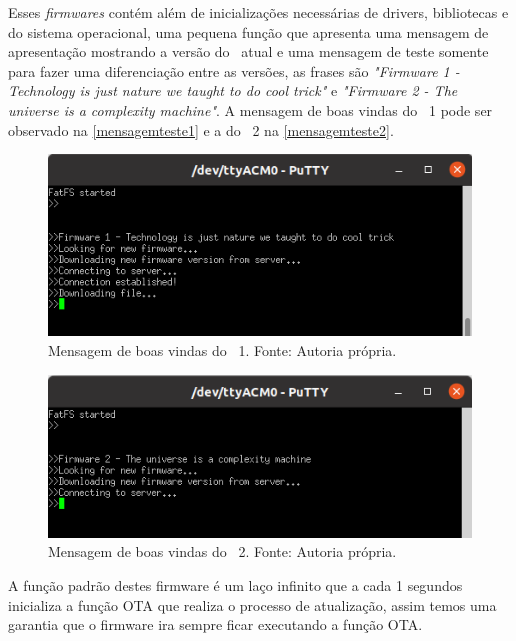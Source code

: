 Esses \textit{firmwares} contém além de inicializações necessárias de drivers, bibliotecas e do sistema operacional, uma pequena função que apresenta uma mensagem de apresentação mostrando a versão do \firmware\ atual e uma mensagem de teste somente para fazer uma diferenciação entre as versões, as frases são \textit{"Firmware 1 - Technology is just nature we taught to do cool trick"} e \textit{"Firmware 2 - The universe is a complexity machine"}. A mensagem de boas vindas do \firmware\ 1 pode ser observado na \autoref{mensagemteste1} e a do \firmware\ 2 na \autoref{mensagemteste2}. 

\begin{figure}[H]
    \scriptsize
     \centering
     \includegraphics[scale=1]{dados/figuras/mensagem1.png}
     \caption{Mensagem de boas vindas do \firmware\ 1. \newline Fonte: Autoria própria.}
     \label{mensagemteste1}
\end{figure}
\begin{figure}[H]
    \scriptsize
     \centering
     \includegraphics[scale=1]{dados/figuras/mensagem2.png}
     \caption{Mensagem de boas vindas do \firmware\ 2. \newline Fonte: Autoria própria.}
     \label{mensagemteste2}
\end{figure}

A função padrão destes firmware é um laço infinito que a cada 1 segundos inicializa a função OTA que realiza o processo de atualização, assim temos uma garantia que o firmware ira sempre ficar executando a função OTA.


